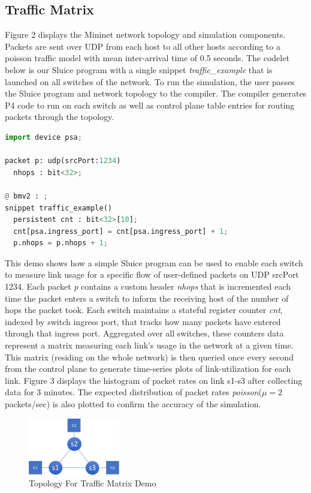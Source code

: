 \subsection{Traffic Matrix}

\noindent Figure 2 displays the Mininet network topology and simulation components. Packets are sent over UDP from each host to all other hosts according to a poisson traffic model with mean inter-arrival time of 0.5 seconds. The codelet below is our Sluice program with a single snippet \textit{traffic\_example} that is launched on all switches of the network. To run the simulation, the user passes the Sluice program and network topology to the compiler. The compiler generates P4 code to run on each switch as well as control plane table entries for routing packets through the topology.  \\
\begin{lstlisting}[language=Python, basicstyle=\scriptsize]
import device psa;

packet p: udp(srcPort:1234)
  nhops : bit<32>;

@ bmv2 : ;
snippet traffic_example()
  persistent cnt : bit<32>[10];
  cnt[psa.ingress_port] = cnt[psa.ingress_port] + 1;
  p.nhops = p.nhops + 1;
\end{lstlisting}

\indent This demo shows how a simple Sluice program can be used to enable each switch to measure link usage for a specific flow of user-defined packets on UDP srcPort 1234. Each packet \textit{p} contains a custom header \textit{nhops} that is incremented each time the packet enters a switch to inform the receiving host of the number of hops the packet took. Each switch maintains a stateful register counter \textit{cnt}, indexed by switch ingress port, that tracks how many packets have entered through that ingress port. Aggregated over all switches, these counters data represent a matrix measuring each link's usage in the network at a given time. This matrix (residing on the whole network) is then queried once every second from the control plane to generate time-series plots of link-utilization for each link. Figure 3 displays the histogram of packet rates on link s1-s3 after collecting data for 3 minutes. The expected distribution of packet rates \textit{poisson}($\mu = 2$ packets/sec) is also plotted to confirm the accuracy of the simulation.

\begin{figure}[tp]
\centering
\includegraphics[width=40mm,scale=0.7]{figures/traf_mat_topo}
\caption{Topology For Traffic Matrix Demo}
\end{figure}


